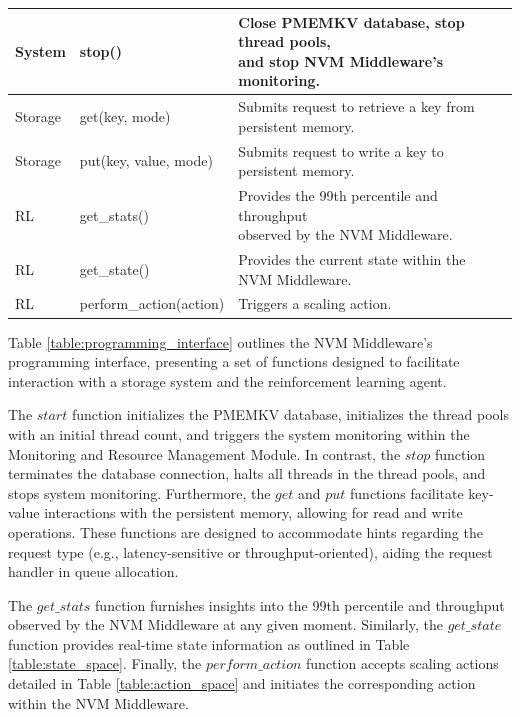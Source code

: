 \begin{table}[ht]
\begin{adjustbox}{width=1\textwidth}
\begin{tabular}{|l|l|l|}
    \hline
    System & stop() & \makecell[cl]{Close PMEMKV database, stop thread pools, \\ and stop NVM Middleware's monitoring.} \\
    \hline
    Storage & get(key, mode) & \makecell[cl] {Submits request to retrieve a key from \\ persistent memory.} \\
    \hline
    Storage & put(key, value, mode) & \makecell[cl] {Submits request to write a key to \\ persistent memory.} \\
    \hline
    RL & get\_stats() & \makecell[cl] {Provides the 99th percentile and throughput \\ observed by the NVM Middleware.} \\
    \hline
    RL & get\_state() & \makecell[cl] {Provides the current state within the \\ NVM Middleware.} \\
    \hline
    RL & perform\_action(action) & Triggers a scaling action. \\
    \hline
  \end{tabular}
\end{adjustbox}
\end{table}


Table \ref{table:programming_interface} outlines the NVM Middleware's programming interface, presenting a set of functions designed to facilitate interaction with a storage system and the reinforcement learning agent. 

The $start$ function initializes the PMEMKV database, initializes the thread pools with an initial thread count, and triggers the system monitoring within the Monitoring and Resource Management Module. In contrast, the $stop$ function terminates the database connection, halts all threads in the thread pools, and stops system monitoring. Furthermore, the $get$ and $put$ functions facilitate key-value interactions with the persistent memory, allowing for read and write operations. These functions are designed to accommodate hints regarding the request type (e.g., latency-sensitive or throughput-oriented), aiding the request handler in queue allocation.

The $get\_stats$ function furnishes insights into the 99th percentile and throughput observed by the NVM Middleware at any given moment. Similarly, the $get\_state$ function provides real-time state information as outlined in Table \ref{table:state_space}. Finally, the $perform\_action$ function accepts scaling actions detailed in Table \ref{table:action_space} and initiates the corresponding action within the NVM Middleware.

